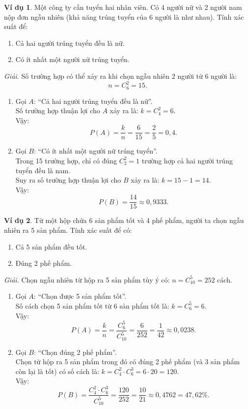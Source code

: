 \documentclass[12pt,a4paper]{article}
\theoremstyle{definition}
\newtheorem{vidu}{Ví dụ}[section]
\begin{document}
\begin{vidu}
Một công ty cần tuyển hai nhân viên. Có 4 người nữ và 2 người nam nộp đơn ngẫu nhiên (khả năng trúng tuyển của 6 người là như nhau). Tính xác suất để:
\begin{enumerate}[label=\arabic*)]
    \item Cả hai người trúng tuyển đều là nữ.
    \item Có ít nhất một người nữ trúng tuyển.
\end{enumerate}
\textit{Giải.} 
Số trường hợp có thể xảy ra khi chọn ngẫu nhiên 2 người từ 6 người là:
\[
n = C_6^2 = 15.
\]
\begin{enumerate}[label=\arabic*)]
    \item Gọi $A$: ``Cả hai người trúng tuyển đều là nữ''.\\
    Số trường hợp thuận lợi cho $A$ xảy ra là: $k = C_4^2 = 6$.\\
    Vậy:
    \[
    P(A) = \frac{k}{n} = \frac{6}{15} = \frac{2}{5} = 0{,}4.
    \]
    \item Gọi $B$: ``Có ít nhất một người nữ trúng tuyển''.\\
    Trong 15 trường hợp, chỉ có đúng $C_2^2 = 1$ trường hợp cả hai người trúng tuyển đều là nam.\\
    Suy ra số trường hợp thuận lợi cho $B$ xảy ra là: $k = 15 - 1 = 14$.\\
    Vậy:
    \[
    P(B) = \frac{14}{15} \approx 0{,}9333.
    \]
\end{enumerate}
\end{vidu}

\begin{vidu}
Từ một hộp chứa 6 sản phẩm tốt và 4 phế phẩm, người ta chọn ngẫu nhiên ra 5 sản phẩm. Tính xác suất để có:
\begin{enumerate}[label=\arabic*)]
    \item Cả 5 sản phẩm đều tốt.
    \item Đúng 2 phế phẩm.
\end{enumerate}
\textit{Giải.} Chọn ngẫu nhiên từ hộp ra 5 sản phẩm tùy ý có: $n = C_{10}^5 = 252$ cách.
\begin{enumerate}[label=\arabic*)]
    \item Gọi $A$: ``Chọn được 5 sản phẩm tốt''.\\
    Số cách chọn 5 sản phẩm tốt từ 6 sản phẩm tốt là: $k = C_6^5 = 6$.\\
    Vậy:
    \[
    P(A) = \frac{k}{n} = \frac{C_6^5}{C_{10}^5} = \frac{6}{252} = \frac{1}{42} \approx 0{,}0238.
    \]
    \item Gọi $B$: ``Chọn đúng 2 phế phẩm''.\\
    Chọn từ hộp ra 5 sản phẩm trong đó có đúng 2 phế phẩm (và 3 sản phẩm còn lại là tốt) có số cách là: $k = C_4^2 \cdot C_6^3 = 6 \cdot 20 = 120$.\\
    Vậy:
    \[
    P(B) = \frac{C_4^2 \cdot C_6^3}{C_{10}^5} = \frac{120}{252} = \frac{10}{21} \approx 0{,}4762 = 47{,}62\%.
    \]
\end{enumerate}
\end{vidu}
\end{document}
